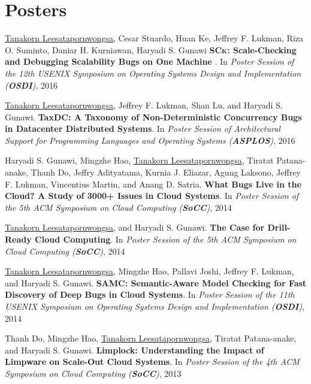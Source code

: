 \documentclass[10pt]{article} %
\begin{document}
\section{Posters}

\underline{Tanakorn Leesatapornwongsa,} Cesar Stuardo, Huan Ke, Jeffrey F.
Lukman, Riza O. Suminto, Daniar H. Kurniawan, Haryadi S. Gunawi
\textbf{\textsc{SCk}: Scale-Checking and Debugging Scalability Bugs on One
Machine }. In \textit{Poster Session of the 12th USENIX Symposium on Operating
Systems Design and Implementation (\textbf{OSDI})}, 2016
\vspace{2mm}

\underline{Tanakorn Leesatapornwongsa,} Jeffrey F. Lukman, Shan Lu, and Haryadi
S. Gunawi. \textbf{TaxDC: A Taxonomy of Non-Deterministic Concurrency Bugs in
Datacenter Distributed Systems}. In \textit{Poster Session of Architectural
Support for Programming Languages and Operating Systems (\textbf{ASPLOS})}, 2016
\vspace{2mm}

Haryadi S. Gunawi, Mingzhe Hao, \underline{Tanakorn Leesatapornwongsa}, Tiratat
Patana-anake, Thanh Do, Jeffry Adityatama, Kurnia J. Eliazar, Agung Laksono,
Jeffrey F. Lukman, Vincentius Martin, and Anang D. Satria. \textbf{What Bugs
Live in the Cloud? A Study of 3000+ Issues in Cloud Systems}. In
\textit{Poster Session of the 5th ACM Symposium on Cloud Computing (\textbf{SoCC})}, 2014
\vspace{2mm}

\underline{Tanakorn Leesatapornwongsa,} and Haryadi S. Gunawi. \textbf{The Case
for Drill-Ready Cloud Computing}. In \textit{Poster Session of the 5th ACM
Symposium on Cloud Computing (\textbf{SoCC})}, 2014
\vspace{2mm}

\underline{Tanakorn Leesatapornwongsa,} Mingzhe Hao, Pallavi Joshi, Jeffrey F.
Lukman, and Haryadi S. Gunawi. \textbf{SAMC: Semantic-Aware Model Checking for
Fast Discovery of Deep Bugs in Cloud Systems}. In \textit{Poster Session of the
11th USENIX Symposium on Operating Systems Design and Implementation (\textbf{OSDI})},
2014
\vspace{2mm}

Thanh Do, Mingzhe Hao, \underline{Tanakorn Leesatapornwongsa}, Tiratat
Patana-anake, and Haryadi S. Gunawi. \textbf{Limplock: Understanding the Impact
of Limpware on Scale-Out Cloud Systems}. In \textit{Poster Session of the 4th ACM
Symposium on Cloud Computing (\textbf{SoCC})}, 2013
\end{document}

